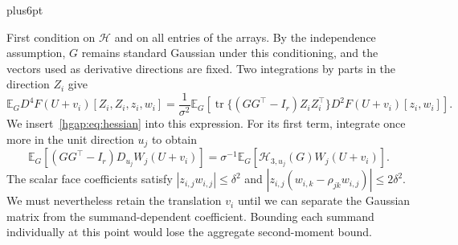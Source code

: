 \documentclass[11pt,letterpaper,twoside,leqno]{article}
\makeatletter
\theoremstyle{bookplain}
\theoremstyle{bookremark}
\renewenvironment{proof}[1][\proofname]{\par
  \pushQED{\qed}\normalfont\topsep6pt plus6pt\relax
  \trivlist\item[\hskip\labelsep\bfseries #1\@addpunct{.}]\ignorespaces
}{\popQED\endtrivlist\@endpefalse}
\newcommand{\E}{\mathbb E}
\newcommand{\tr}{\operatorname{tr}}
\makeatother
\begin{document}
\begin{proof}
First condition on $\mathcal H$ and on all entries of the arrays.
By the independence assumption, $G$ remains standard Gaussian under
this conditioning, and the vectors used as derivative directions are
fixed. Two integrations by parts in the direction $Z_i$ give
\[
 \E_G D^4F(U+v_i)[Z_i,Z_i,z_i,w_i]
 =\frac1{\sigma^2}\E_G\left[
       \tr\{(GG^\top-I_r)Z_iZ_i^\top\}
                       D^2F(U+v_i)[z_i,w_i]\right].
\]
We insert~\eqref{hgap:eq:hessian} into this expression. For its first term, integrate once more
in the unit direction $u_j$ to obtain
\[
 \E_G[(GG^\top-I_r)D_{u_j}W_j(U+v_i)]
 =\sigma^{-1}\E_G[\mathcal H_{3,u_j}(G)W_j(U+v_i)].
\]
The scalar face coefficients satisfy
$|z_{i,j}w_{i,j}|\le\delta^2$ and
$|z_{i,j}(w_{i,k}-\rho_{jk}w_{i,j})|\le2\delta^2$.
We must nevertheless retain the translation $v_i$ until we can
separate the Gaussian matrix from the summand-dependent coefficient.
Bounding each summand individually at this point would lose the
aggregate second-moment bound.


\end{proof}
\end{document}
